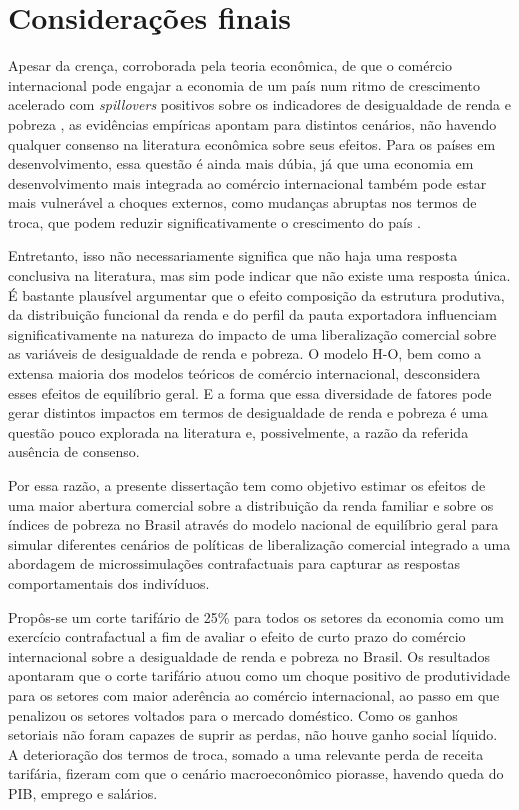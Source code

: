 

\chapter{Considerações finais}

Apesar da crença, corroborada pela teoria econômica, de que o comércio internacional pode engajar a economia de um país num ritmo de crescimento acelerado com \textit{spillovers} positivos sobre os indicadores de desigualdade de renda e pobreza \cite{carneiro06}, as evidências empíricas apontam para distintos cenários, não havendo qualquer consenso na literatura econômica sobre seus efeitos. Para os países em desenvolvimento, essa questão é ainda mais dúbia, já que uma economia em desenvolvimento mais integrada ao comércio internacional também pode estar mais vulnerável a choques externos, como mudanças abruptas nos termos de troca, que podem reduzir significativamente o crescimento do país \cite{bannisterthugge01}.

Entretanto, isso não necessariamente significa que não haja uma resposta conclusiva na literatura, mas sim pode indicar que não existe uma resposta única. É bastante plausível argumentar que o efeito composição da estrutura produtiva, da distribuição funcional da renda e do perfil da pauta exportadora influenciam significativamente na natureza do impacto de uma liberalização comercial sobre as variáveis de desigualdade de renda e pobreza. O modelo H-O, bem como a extensa maioria dos modelos teóricos de comércio internacional, desconsidera esses efeitos de equilíbrio geral. E a forma que essa diversidade de fatores pode gerar distintos impactos em termos de desigualdade de renda e pobreza é uma questão pouco explorada na literatura e, possivelmente, a razão da referida ausência de consenso.

Por essa razão, a presente dissertação tem como objetivo estimar os efeitos de uma maior abertura comercial sobre a distribuição da renda familiar e sobre os índices de pobreza no Brasil através do modelo nacional de equilíbrio geral para simular diferentes cenários de políticas de liberalização comercial integrado a uma abordagem de microssimulações contrafactuais para capturar as respostas comportamentais dos indivíduos. 

Propôs-se um corte tarifário de 25\% para todos os setores da economia como um exercício contrafactual a fim de avaliar o efeito de curto prazo do comércio internacional sobre a desigualdade de renda e pobreza no Brasil. Os resultados apontaram que o corte tarifário atuou como um choque positivo de produtividade para os setores com maior aderência ao comércio internacional, ao passo em que penalizou os setores voltados para o mercado doméstico. Como os ganhos setoriais não foram capazes de suprir as perdas, não houve ganho social líquido. A deterioração dos termos de troca, somado a uma relevante perda de receita tarifária, fizeram com que o cenário macroeconômico piorasse, havendo queda do PIB, emprego e salários.

